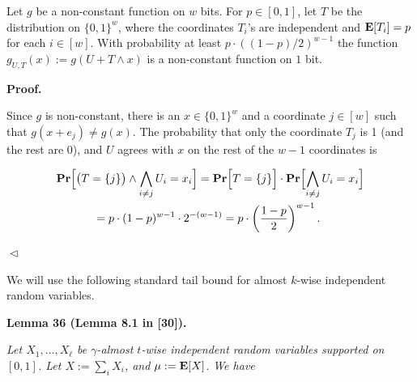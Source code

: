 \documentclass[10pt,a4paper]{article}
\begin{document}
Let $g$ be a non-constant function on $w$ bits.
For $p\in[0,1]$, let $T$ be the distribution on $\{0,1\}^{w}$, where the coordinates $T_{i}$’s are independent and $\mathop{\bf E\/}[T_{i}]=p$ for each $i\in[w]$.
With probability at least $p\cdot((1-p)/2)^{w-1}$ the function $g_{U,T}(x):=g(U+T\wedge x)$ is a non-constant function on $1$ bit.\par







\par\medskip\noindent\textbf{
\textbf{Proof}.}\par




Since $g$ is non-constant, there is an $x\in\{0,1\}^{w}$ and a coordinate $j\in[w]$ such that $g(x+e_{j})\neq g(x)$.
The probability that only the coordinate $T_{j}$ is 1 (and the rest are 0), and $U$ agrees with $x$ on the rest of the $w-1$ coordinates is\par


\[\begin{gathered}
\displaystyle\mathop{\bf Pr\/}\Bigl{[}\bigl{(}T=\{j\}\bigr{)}\wedge\bigwedge_{i\neq j}U_{i}=x_{i}\Bigr{]} \displaystyle=\mathop{\bf Pr\/}\Bigl{[}T=\{j\}\Bigr{]}\cdot\mathop{\bf Pr\/}\Bigl{[}\bigwedge_{i\neq j}U_{i}=x_{i}\Bigr{]} \\
\displaystyle=p\cdot(1-p)^{w-1}\cdot 2^{-(w-1)}=p\cdot\left(\frac{1-p}{2}\right)^{w-1}.\
\end{gathered}\]


$\vartriangleleft$\par




We will use the following standard tail bound for almost $k$-wise independent random variables.\par





\par\medskip\noindent\textbf{
\textbf{Lemma 36}\textbf{ }(Lemma 8.1 in [30])\textbf{.}
}\par



\emph{Let $X_{1},\ldots,X_{\ell}$ be $\gamma$-almost $t$-wise independent random variables supported on $[0,1]$.
Let $X:=\sum_{i}X_{i}$, and $\mu:=\mathop{\bf E\/}[X]$.
We have}\par
\end{document}
